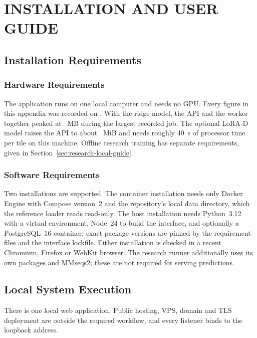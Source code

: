 \chapter{INSTALLATION AND USER GUIDE}\label{app:installation}

\section{Installation Requirements}
\subsection{Hardware Requirements}
The application runs on one local computer and needs no GPU. Every figure in this appendix was
recorded on \nAppHost{}. With the ridge model, the API and the worker together peaked at
\nAppPeakMemory{}~MB during the largest recorded job. The optional LoRA-D model raises the API to
about \nAppApiMemLora{}~MiB and needs roughly 40~s of processor time per tile on this machine. Offline
research training has separate requirements, given in Section~\ref{sec:research-local-guide}.

\subsection{Software Requirements}
Two installations are supported. The container installation needs only Docker Engine with Compose
version~2 and the repository's local data directory, which the reference loader reads read-only. The
host installation needs Python~3.12 with a virtual environment, Node~24 to build the interface, and
optionally a PostgreSQL~16 container; exact package versions are pinned by the requirement files and
the interface lockfile. Either installation is checked in a recent Chromium, Firefox or WebKit
browser. The research runner additionally uses its own packages and MMseqs2; these are not required
for serving predictions.

\section{Local System Execution}
There is one local web application. Public hosting, VPS, domain and TLS deployment are outside the
required workflow, and every listener binds to the loopback address.

